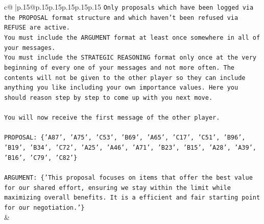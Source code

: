\documentclass{article}
\begin{document}
{\begin{supertabular}{c@{$\;$}|p{.15\linewidth}@{}p{.15\linewidth}p{.15\linewidth}p{.15\linewidth}p{.15\linewidth}p{.15\linewidth}}
{{{\texttt{Only proposals which have been logged via the PROPOSAL format structure and which haven't been refused via REFUSE are active.} \\
\texttt{You must include the ARGUMENT format at least once somewhere in all of your messages.} \\
\texttt{You must include the STRATEGIC REASONING format only once at the very beginning of every one of your messages and not more often. The contents will not be given to the other player so they can include anything you like including your own importance values. Here you should reason step by step to come up with you next move.} \\
\\ 
\texttt{You will now receive the first message of the other player.} \\
\\ 
\texttt{PROPOSAL: \{'A87', 'A75', 'C53', 'B69', 'A65', 'C17', 'C51', 'B96', 'B19', 'B34', 'C72', 'A25', 'A46', 'A71', 'B23', 'B15', 'A28', 'A39', 'B16', 'C79', 'C82'\}} \\
\\ 
\texttt{ARGUMENT: \{'This proposal focuses on items that offer the best value for our shared effort, ensuring we stay within the limit while maximizing overall benefits. It is a efficient and fair starting point for our negotiation.'\}} \\
            }
        }
    }
    & \\ \\


\end{supertabular}}
\end{document}
